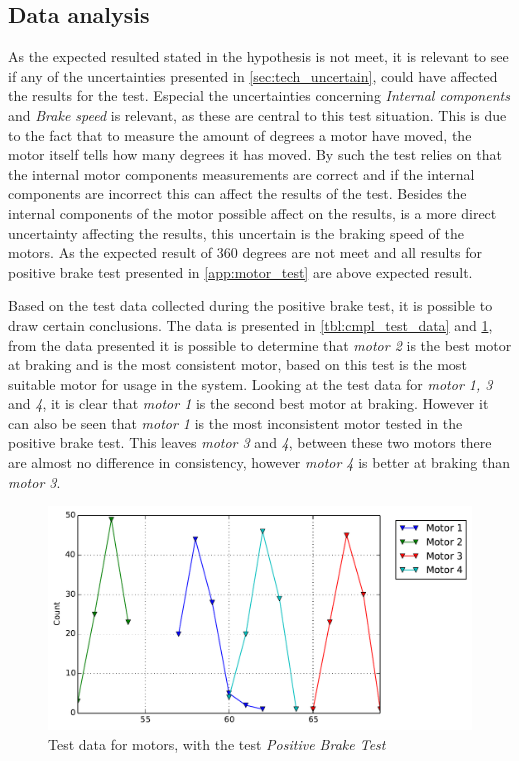 \subsection{Data analysis}
As the expected resulted stated in the hypothesis is not meet, it is relevant to see if any of the uncertainties presented in \cref{sec:tech_uncertain}, could have affected the results for the test. Especial the uncertainties concerning \emph{Internal components} and \emph{Brake speed} is relevant, as these are central to this test situation. This is due to the fact that to measure the amount of degrees a motor have moved, the motor itself tells how many degrees it has moved. By such the test relies on that the internal motor components measurements are correct and if the internal components are incorrect this can affect the results of the test. Besides the internal components of the motor possible affect on the results, is a more direct uncertainty affecting the results, this uncertain is the braking speed of the motors. As the expected result of 360 degrees are not meet and all results for positive brake test presented in \cref{app:motor_test} are above expected result.

Based on the test data collected during the positive brake test, it is possible to draw certain conclusions. The data is presented in \cref{tbl:cmpl_test_data} and \cref{fig:cmp_all}, from the data presented it is possible to determine that \emph{motor 2} is the best motor at braking and is the most consistent motor, based on this test is the most suitable motor for usage in the system. Looking at the test data for \emph{motor 1, 3} and \emph{4}, it is clear that \emph{motor 1} is the second best motor at braking. However it can also be seen that \emph{motor 1} is the most inconsistent motor tested in the positive brake test. This leaves \emph{motor 3} and \emph{4}, between these two motors there are almost no difference in consistency, however \emph{motor 4} is better at braking than \emph{motor 3}.

\begin{figure}[ht]
  \centering
  \includegraphics[scale=0.5]{graphics/test_graphs/Break_lineplot.pdf}
  \caption{Test data for motors, with the test \emph{Positive Brake Test}}
  \label{fig:cmp_all}
\end{figure}

